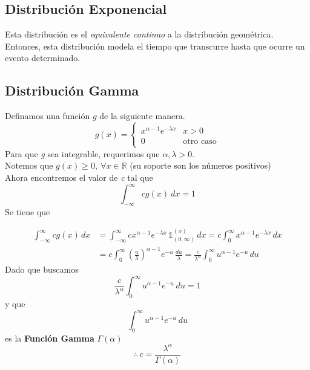 \subsection{Distribución Exponencial}
Esta distribución es el \textit{equivalente continuo} a la distribución geométrica. Entonces, esta distribución modela el tiempo que transcurre hasta que ocurre un evento determinado.


\subsection{Distribución Gamma}

Definamos una función $g$ de la siguiente manera.
\[g(x) = 
  \begin{cases}
    x^{\alpha - 1}e^{-\lambda x} & x > 0\\
    0 & \text{otro caso}
  \end{cases}
\]
Para que \textit{g} sea integrable, requerimos que $\alpha, \lambda > 0$.\\
Notemos que $g(x) \ge 0,~ \forall x \in \mathbb R$ (su soporte son los números positivos)\\
Ahora encontremos el valor de \textit{c} tal que
\[\int_{-\infty}^{\infty}cg(x)~dx = 1\] Se tiene que

\begin{align*}
  \int_{-\infty}^{\infty}cg(x)\,dx &= \int_{-\infty}^{\infty}c x^{\alpha -1}e^{-\lambda x} \, \mathbb 1_{(0, \infty)}^{(x)} \,dx = c\int_0^{\infty} x^{\alpha -1}e^{-\lambda x} \,dx\\
                                  &= c\int_0^{\infty}(\frac  u\lambda)^{\alpha-1}e^{-u}\, \frac{du}\lambda = \frac c{\lambda^\alpha} \int_0^{\infty} u^{\alpha - 1}e^{-u}\,du
\end{align*}
Dado que buscamos 
\[\frac c{\lambda^\alpha} \int_0^{\infty} u^{\alpha - 1}e^{-u}~du = 1\] y que 
\[\int_0^{\infty} u^{\alpha - 1}e^{-u}~du\] es la \textbf{Función Gamma} $\Gamma(\alpha)$
\[\boxed{\therefore \,c = \frac{\lambda^\alpha}{\Gamma(\alpha)}}\]

